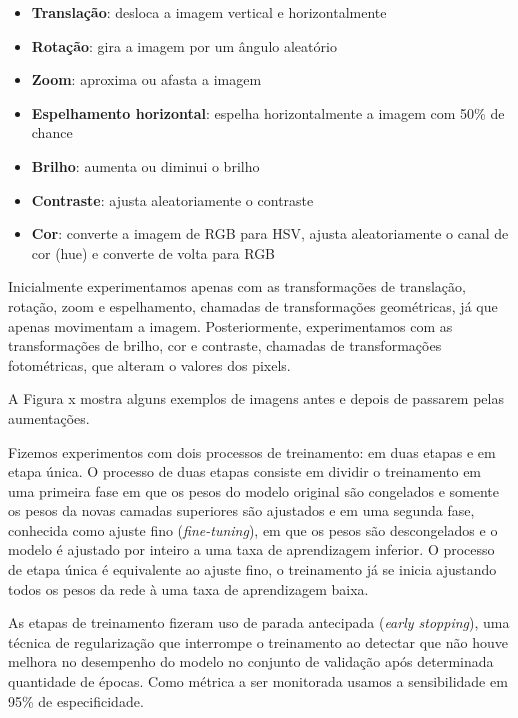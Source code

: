 \documentclass[12pt]{article}
\begin{document}
\begin{itemize}[noitemsep]
    \item \textbf{Translação}: desloca a imagem vertical e horizontalmente
    \item \textbf{Rotação}: gira a imagem por um ângulo aleatório
    \item \textbf{Zoom}: aproxima ou afasta a imagem
    \item \textbf{Espelhamento horizontal}: espelha horizontalmente a imagem com 50\% de chance
    \item \textbf{Brilho}: aumenta ou diminui o brilho
    \item \textbf{Contraste}: ajusta aleatoriamente o contraste
    \item \textbf{Cor}: converte a imagem de RGB para HSV, ajusta aleatoriamente o canal de cor (hue) e converte de volta para RGB
\end{itemize}

Inicialmente experimentamos apenas com as transformações de translação, rotação, zoom e espelhamento, chamadas de transformações geométricas, já que apenas movimentam a imagem. Posteriormente, experimentamos com as transformações de brilho, cor e contraste, chamadas de transformações fotométricas, que alteram o valores dos pixels.

A Figura x mostra alguns exemplos de imagens antes e depois de passarem pelas aumentações.

Fizemos experimentos com dois processos de treinamento: em duas etapas e em etapa única. O processo de duas etapas consiste em dividir o treinamento em uma primeira fase em que os pesos do modelo original são congelados e somente os pesos da novas camadas superiores são ajustados e em uma segunda fase, conhecida como ajuste fino (\emph{fine-tuning}), em que os pesos são descongelados e o modelo é ajustado por inteiro a uma taxa de aprendizagem inferior. O processo de etapa única é equivalente ao ajuste fino, o treinamento já se inicia ajustando todos os pesos da rede à uma taxa de aprendizagem baixa.

As etapas de treinamento fizeram uso de parada antecipada (\emph{early stopping}), uma técnica de regularização que interrompe o treinamento ao detectar que não houve melhora no desempenho do modelo no conjunto de validação após determinada quantidade de épocas. Como métrica a ser monitorada usamos a sensibilidade em 95\% de especificidade.

\end{document}
